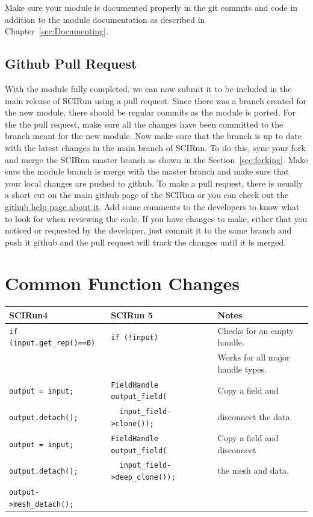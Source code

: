 \documentclass[fleqn,11pt,openany]{book}
\begin{document}
Make sure your module is documented properly in the git commits and code in addition to the module documentation as described in Chapter~\ref{sec:Documenting}.

\subsection{Github Pull Request}

With the module fully completed, we can now submit it to be included in the main release of SCIRun using a pull request.  
Since there was a branch created for the new module, there should be regular commits as the module is ported.
For the the pull request, make sure all the changes have been committed to the branch meant for the new module.  
Now make sure that the branch is up to date with the latest changes in the main branch of SCIRun. 
To do this, sync your fork and merge the SCIRun master branch as shown in the Section~\ref{sec:forking}.
Make sure the module branch is merge with the master branch and make sure that your local changes are pushed to github.  
To make a pull request, there is usually a short cut on the main github page of the SCIRun or you can check out the \href{https://help.github.com/articles/using-pull-requests/}{github help page about it}.  
Add some comments to the developers to know what to look for when reviewing the code. 
If you have changes to make, either that you noticed or requested by the developer, just commit it to the same branch and push it github and the pull request will track the changes until it is merged.  

\section{Common Function Changes}
\label{sec:changes}

\begin{tabular}{|l|l|l|}
\hline
\bf{SCIRun4} & \bf{SCIRun 5} & \bf{Notes}\\ 
\hline
\verb|if (input.get_rep()==0)| 	& \verb|if (!input)| 					& Checks for an empty handle.\\
                                                	&					 			& Works for all major handle types. \\
\hline
\verb|output = input;| 		& \verb|FieldHandle  output_field( |		& Copy a field and \\
\verb|output.detach();|              	& \verb|  input_field->clone());| 			& disconnect the data\\
\hline
\verb|output = input;| 		& \verb|FieldHandle  output_field( |		& Copy a field and disconnect  \\
\verb|output.detach();|              	& \verb|  input_field->deep_clone());| 	& the mesh and data. \\
\verb|output->mesh_detach();| 	& 								&  \\                                                           
\hline
\end{tabular}
\end{document}
